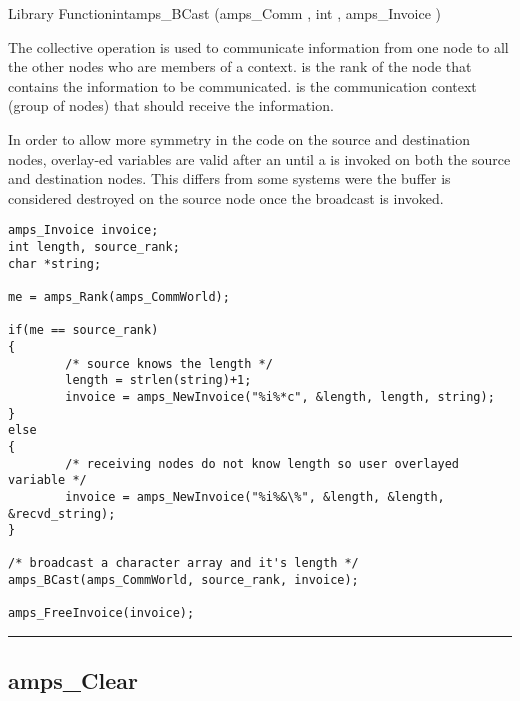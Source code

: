\begin{deftypefn}{Library Function}{int}{amps\_BCast}
(amps_Comm , int , amps_Invoice )

\DESCRIPTION

The collective operation  is used to communicate
information from one node to all the other nodes who are members
of a context.   is the rank of the node that contains
the information to be communicated.   is the communication
context (group of nodes) that should receive the information.

In order to allow more symmetry in the code on the source and destination
nodes, overlay-ed variables are valid after an  until a
 is invoked on both the source and destination
nodes.  This differs from some systems were the buffer is considered
destroyed on the source node once the broadcast is invoked.

\EXAMPLE

\begin{display}\begin{verbatim}
amps_Invoice invoice;
int length, source_rank;
char *string;

me = amps_Rank(amps_CommWorld);

if(me == source_rank)
{
        /* source knows the length */
        length = strlen(string)+1;
        invoice = amps_NewInvoice("%i%*c", &length, length, string);
}
else
{
        /* receiving nodes do not know length so user overlayed variable */
        invoice = amps_NewInvoice("%i%&\%", &length, &length, &recvd_string);
}

/* broadcast a character array and it's length */
amps_BCast(amps_CommWorld, source_rank, invoice);

amps_FreeInvoice(invoice);
\end{verbatim}\end{display}

\end{deftypefn}

\noindent\rule{\textwidth}{1mm}

\subsection{amps\_Clear}
\label{amps_Clear}

